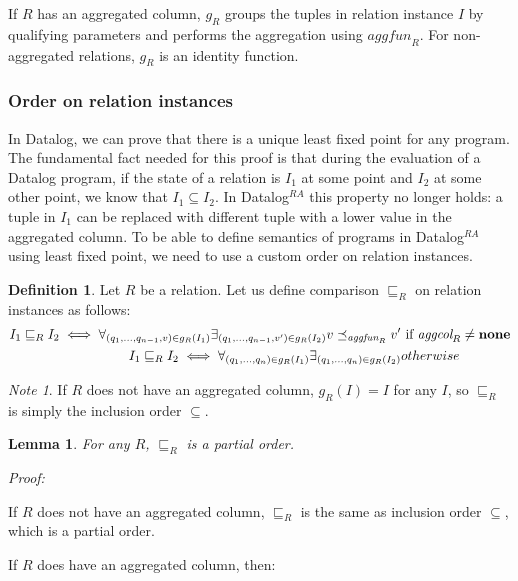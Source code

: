 \documentclass{pracamgr}
\theoremstyle{plain}
\newtheorem{lem}[thm]{Lemma}
\theoremstyle{definition}
\newtheorem{defn}{Definition}[section]
\theoremstyle{remark}
\newtheorem*{note}{Note}
\newcommand{\datalogra}{Datalog$^{RA}$ }
\newcommand{\aggfun}{\textit{aggfun} }
\newcommand{\aggcol}{\textit{aggcol} }
\begin{document}
If $R$ has an aggregated column, $g_R$ groups the tuples in relation instance $I$ by qualifying parameters and performs the aggregation using $\aggfun_R$. For non-aggregated relations, $g_R$ is an identity function.

\subsubsection{Order on relation instances}
In Datalog, we can prove that there is a unique least fixed point for any program. The fundamental fact needed for this proof is that during the evaluation of a Datalog program, if the state of a relation is $I_1$ at some point and $I_2$ at some other point, we know that $I_1 \subseteq I_2$. In \datalogra this property no longer holds: a tuple in $I_1$ can be replaced with different tuple with a lower value in the aggregated column. To be able to define semantics of programs in \datalogra using least fixed point, we need to use a custom order on relation instances.

\begin{defn}
Let $R$ be a relation. Let us define comparison $\sqsubseteq_R$ on relation instances as follows:
\begin{align}
I_1 \sqsubseteq_R I_2 \iff \forall_{(q_1, ..., q_{n-1}, v) \in g_R(I_1)} \exists_{(q_1, ..., q_{n-1}, v') \in g_R(I_2)} v \preceq_{\aggfun_R} v' & \text{ if } \aggcol_R \ne \bf{none} \\
I_1 \sqsubseteq_R I_2 \iff \forall_{(q_1, ..., q_n) \in g_R(I_1)} \exists_{(q_1, ..., q_n) \in g_R(I_2)} & otherwise
\end{align}
\end{defn}

\begin{note}
If $R$ does not have an aggregated column, $g_R(I) = I$ for any $I$, so $\sqsubseteq_R$ is simply the inclusion order $\subseteq$. 
\end{note}

\begin{lem}
For any $R$, $\sqsubseteq_R$ is a partial order.
\end{lem}

\emph{Proof:}

If $R$ does not have an aggregated column, $\sqsubseteq_R$ is the same as inclusion order $\subseteq$, which is a partial order.

If $R$ does have an aggregated column, then:
\end{document}
